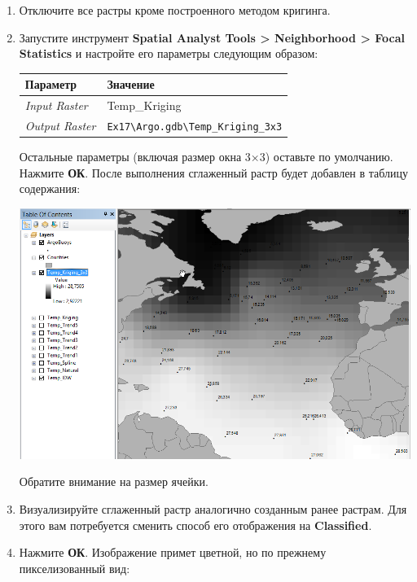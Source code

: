 \documentclass[12pt,]{book}
\begin{document}
\begin{enumerate}
\def\labelenumi{\arabic{enumi}.}
\item
  Отключите все растры кроме построенного методом кригинга.
\item
  Запустите инструмент \textbf{Spatial Analyst Tools \textgreater{} Neighborhood \textgreater{} Focal Statistics} и настройте его параметры следующим образом:

  \begin{longtable}[]{@{}ll@{}}
  \toprule
  Параметр & Значение\tabularnewline
  \midrule
  \endhead
  \emph{Input Raster} & Temp\_Kriging\tabularnewline
  \emph{Output Raster} & \texttt{Ex17\textbackslash{}Argo.gdb\textbackslash{}Temp\_Kriging\_3x3}\tabularnewline
  \bottomrule
  \end{longtable}

  Остальные параметры (включая размер окна 3×3) оставьте по умолчанию. Нажмите \textbf{ОК}. После выполнения сглаженный растр будет добавлен в таблицу содержания:

  \includegraphics{images/Ex17/image13.png}

  Обратите внимание на размер ячейки.
\item
  Визуализируйте сглаженный растр аналогично созданным ранее растрам. Для этого вам потребуется сменить способ его отображения на \textbf{Classified}.
\item
  Нажмите \textbf{ОК}. Изображение примет цветной, но по прежнему пикселизованный вид:


\end{enumerate}
\end{document}

